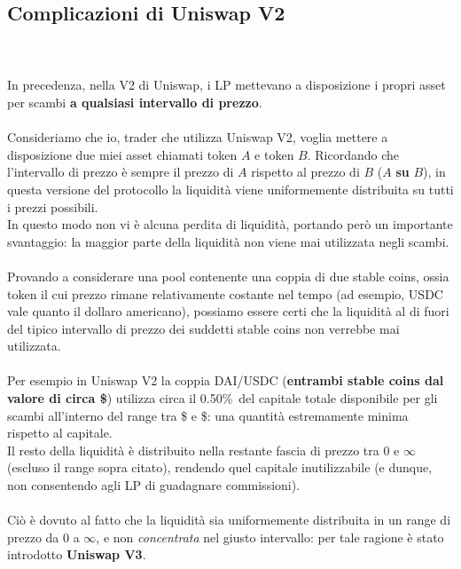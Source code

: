 \documentclass[12pt,a4paper]{report}
\begin{document}
\subsection{Complicazioni di Uniswap V2}

\\\\In precedenza, nella V2 di Uniswap, i LP mettevano a disposizione i propri asset per scambi \textbf{a qualsiasi intervallo di prezzo}.
\\\\Consideriamo che io, trader che utilizza Uniswap V2, voglia mettere a disposizione due miei asset chiamati token $A$ e token $B$.
Ricordando che l'intervallo di prezzo è sempre il prezzo di $A$ rispetto al prezzo di $B$ ($A$ \textbf{su} $B$), in questa versione del protocollo la liquidità viene uniformemente distribuita su tutti i prezzi possibili.
\\In questo modo non vi è alcuna perdita di liquidità, portando però un importante svantaggio: la maggior parte della liquidità non viene mai utilizzata negli scambi.
\\\\Provando a considerare una pool contenente una coppia di due stable coins, ossia token il cui prezzo rimane relativamente costante nel tempo (ad esempio, USDC vale quanto il dollaro americano), possiamo essere certi che la liquidità al di fuori del tipico intervallo di prezzo dei suddetti stable coins non verrebbe mai utilizzata.
\\\\Per esempio in Uniswap V2 la coppia DAI/USDC (\textbf{entrambi stable coins dal valore di circa \$}) utilizza circa il 0.50\%\ del capitale totale disponibile per gli scambi all'interno del range tra \$ e \$\cite{v2_waste}: una quantità estremamente minima rispetto al capitale.\\Il resto della liquidità è distribuito nella restante fascia di prezzo tra 0 e $\infty$ (escluso il range sopra citato), rendendo quel capitale inutilizzabile (e dunque, non consentendo agli LP di guadagnare commissioni). 
\\\\Ciò è dovuto al fatto che la liquidità sia uniformemente distribuita in un range di prezzo da 0 a $\infty$, e non \textit{concentrata} nel giusto intervallo: per tale ragione è stato introdotto \textbf{Uniswap V3}.
\end{document}
